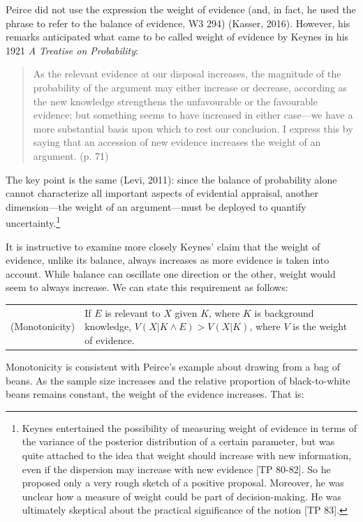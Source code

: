 \documentclass[
  10pt,
  dvipsnames,enabledeprecatedfontcommands]{scrartcl}
\begin{document}
Peirce did not use the expression the weight of evidence (and, in fact,
he used the phrase to refer to the balance of evidence, W3 294) (Kasser,
2016). However, his remarks anticipated what came to be called weight of
evidence by Keynes in his 1921 \emph{A Treatise on Probability}:

\begin{quote}
As the relevant evidence at our disposal increases, the magnitude of the
probability of the argument may either increase or decrease, according as the new knowledge strengthens the unfavourable or the favourable evidence; but something seems to have increased in either case---we have a more substantial basis upon which to rest our conclusion. I express this by saying that an accession of new evidence increases the weight of an argument. (p. 71)
\end{quote}

\noindent The key point is the same (Levi, 2011): since the balance of
probability alone cannot characterize all important aspects of
evidential appraisal, another dimension---the weight of an
argument---must be deployed to quantify uncertainty.\footnote{Keynes
  entertained the possibility of measuring weight of evidence in terms
  of the variance of the posterior distribution of a certain parameter,
  but was quite attached to the idea that weight should increase with
  new information, even if the dispersion may increase with new evidence
  {[}TP 80-82{]}. So he proposed only a very rough sketch of a positive
  proposal. Moreover, he was unclear how a measure of weight could be
  part of decision-making. He was ultimately skeptical about the
  practical significance of the notion {[}TP 83{]}.}

It is instructive to examine more closely Keynes' claim that the weight
of evidence, unlike its balance, always increases as more evidence is
taken into account. While balance can oscillate one direction or the
other, weight would seem to always increase. We can state this
requirement as follows:

\vspace{1mm}
\begin{tabular}{lp{9cm}}
(Monotonicity) & If $E$ is relevant to $X$ given $K$, where $K$ is background knowledge, $V(X\vert K \wedge E) > V(X\vert K)$, where $V$ is the weight of evidence.
\end{tabular}
\vspace{1mm}

\noindent Monotonicity is consistent with Peirce's example about drawing
from a bag of beans. As the sample size increases and the relative
proportion of black-to-white beans remains constant, the weight of the
evidence increases. That is:
\end{document}
